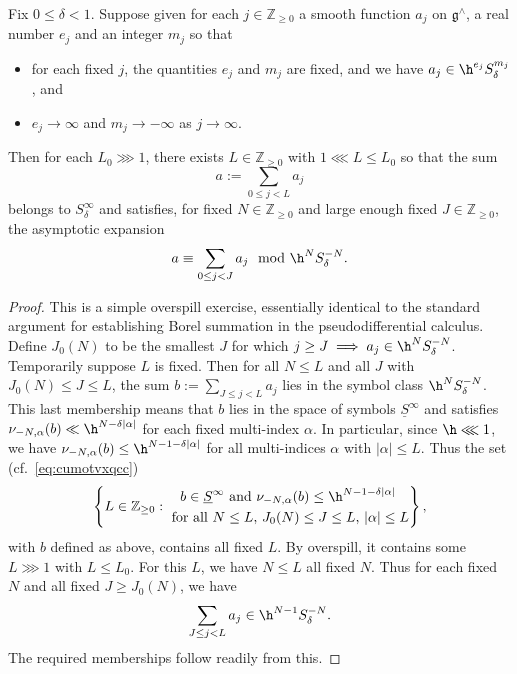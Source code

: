 \begin{lemma}\label{lem:borel-summation}
  Fix $0 \leq \delta < 1$.  Suppose given for each $j \in \mathbb{Z}_{\geq 0}$ a smooth function $a_j$ on $\mathfrak{g}^\wedge$, a real number $e_j$ and an integer $m_j$ so that
  \begin{itemize}
  \item for each fixed $j$, the quantities $e_j$ and $m_j$ are fixed, and we have $a_j \in \h^{e_j} S^{m_j}_\delta$, and
  \item $e_j \rightarrow \infty$ and $m_j \rightarrow -\infty$ as $j \rightarrow \infty$.
  \end{itemize}
  Then for each $L_0 \ggg 1$, there exists $L \in \mathbb{Z}_{\geq 0}$ with $1 \lll L  \leq L_0$ so that the sum
  \begin{equation}\label{eq::=-sum-_0}
    a := \sum_{0 \leq j < L} a_j
  \end{equation}
  belongs to $S^{\infty}_{\delta}$ and satisfies, for fixed $N \in \mathbb{Z}_{\geq 0}$ and large enough fixed $J \in \mathbb{Z}_{\geq 0}$, the asymptotic expansion
  \begin{equation}\label{eq:cui1g9lsvk}
    a \equiv \sum_{0 \leq j < J} a_j \mod{\h^N S^{-N}_\delta}.
  \end{equation}
\end{lemma}
\begin{proof}
  This is a simple overspill exercise, essentially identical to the standard argument for establishing Borel summation in the pseudodifferential calculus.  Define $J_0(N)$ to be the smallest $J$ for which $j \geq J \implies a_j \in \h^N S_\delta^{-N}$.  Temporarily suppose $L$ is fixed.  Then for all $N \leq L$ and all $J$ with $J_0(N) \leq J \leq L$, the sum $b := \sum_{J \leq j < L} a_j$ lies in the symbol class $\h^{N} S_\delta^{-N}$.  This last membership means that $b$ lies in the space of symbols $\underline{S}^{\infty}$ and satisfies $\nu_{-N,\alpha}(b) \ll \h^{N - \delta |\alpha|}$ for each fixed multi-index $\alpha$.  In particular, since $\h \lll 1$, we have $\nu_{-N,\alpha}(b) \leq \h^{N - 1 - \delta |\alpha|}$ for all multi-indices $\alpha$ with $|\alpha| \leq L$.  Thus the set (cf.\ \eqref{eq:cumotvxqcc})
  \begin{equation*}
    \left\{
      L \in \mathbb{Z}_{\geq 0} :
      \begin{gathered}
        b \in \underline{S}^{\infty} \text{ and }
        \nu_{-N,\alpha}(b) \leq \h^{N - 1 - \delta |\alpha|} \\
        \text{ for all } N \leq L, \, J_0(N) \leq J \leq L, \,  |\alpha| \leq L
      \end{gathered}
    \right\},
  \end{equation*}
  with $b$ defined as above, contains all fixed $L$.  By overspill, it contains some $L \ggg 1$ with $L \leq L_0$.  For this $L$, we have $N \leq L$ all fixed $N$.  Thus for each fixed $N$ and all fixed $J \geq J_0(N)$, we have
  \begin{equation*}
    \sum_{J \leq j < L } a_j \in \h^{N-1} S_{\delta}^{-N}.
  \end{equation*}
  The required memberships follow readily from this.\end{proof}


